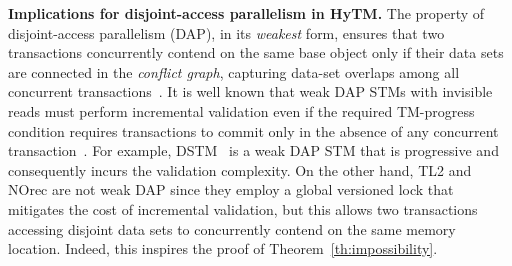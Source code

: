\vspace{1mm}\noindent\textbf{Implications for disjoint-access parallelism in HyTM.}
The property of disjoint-access parallelism (DAP), in its \emph{weakest} form, ensures that two transactions %
concurrently contend on the same base object 
only if their data 
sets are connected in the \emph{conflict graph}, capturing 
data-set overlaps among all concurrent transactions~\cite{AHM09}. It is well known that weak DAP STMs with invisible reads must perform incremental validation even if the required TM-progress condition requires
transactions to commit only in the absence of any concurrent transaction~\cite{tm-book,prog15-pact}. For example, DSTM~\cite{HLM+03} is a weak DAP STM that is progressive and consequently incurs the validation
complexity. On the other hand, TL2 and NOrec are not weak DAP since they employ a global versioned lock that mitigates the cost of incremental validation, but this allows two transactions accessing
disjoint data sets to concurrently contend on the same memory location. Indeed, this inspires the proof of Theorem~\ref{th:impossibility}. 

